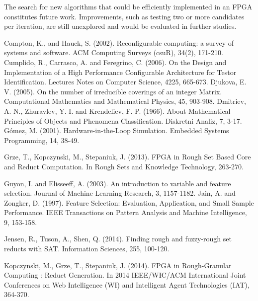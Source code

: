 \documentclass[authoryear,preprint,review,12pt]{elsarticle}
\begin{document}
The search for new algorithms that could be efficiently implemented in an FPGA constitutes future work. Improvements, such as testing two or more candidates per iteration, are still unexplored and would be 
evaluated in further studies.







\begin{thebibliography}{00}

Compton, K., and Hauck, S. (2002). Reconfigurable computing: a survey of systems and software. ACM Computing Surveys (csuR), 34(2), 171-210.
 Cumplido, R., Carrasco, A. and Feregrino, C. (2006). On the Design and Implementation of a High Performance Configurable Architecture for Testor Identification. Lectures Notes on Computer Science, 4225, 665-673.
Djukova, E. V. (2005). On the number of irreducible coverings of an integer Matrix. Computational Mathematics and Mathematical Physics, 45, 903-908.
 Dmitriev, A. N.,  Zhuravlev, Y. I. and Krendeliev, F. P. (1966). About Mathematical Principles of Objects and Phenomena Classification. Diskretni Analiz, 7, 3-17.
G\'omez, M. (2001). Hardware-in-the-Loop Simulation. Embedded Systems Programming, 14, 38-49.

Grze, T., Kopczynski, M., Stepaniuk, J. (2013). FPGA in Rough Set Based Core and Reduct Computation. In Rough Sets and Knowledge Technology, 263-270.

Guyon, I. and Elisseeff, A. (2003). An introduction to variable and feature selection. Journal of Machine Learning Research, 3, 1157-1182.
Jain, A. and Zongker, D. (1997). Feature Selection: Evaluation, Application, and Small Sample Performance. IEEE Transactions on Pattern Analysis and Machine Intelligence, 9, 153-158.

Jensen, R., Tuson, A., Shen, Q. (2014). Finding rough and fuzzy-rough set reducts with SAT. Information Sciences, 255, 100-120.

Kopczynski, M., Grze, T., Stepaniuk, J. (2014). FPGA in Rough-Granular Computing : Reduct Generation. In 2014 IEEE/WIC/ACM International Joint Conferences on Web Intelligence (WI) and Intelligent Agent Technologies (IAT), 364-370. 


\end{thebibliography}
\end{document}
